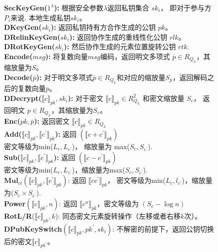 \begin{figure}[!htb]
	\begin{framed}
		\noindent \textbf{SecKeyGen($1^\lambda$):} 根据安全参数$ \lambda $返回私钥集合 ${sk_i}$，
		即对于参与方$P_i$来说. 本地生成私钥$ sk_i $。\\
		\noindent \textbf{DKeyGen(${sk_i}$):} 返回私钥持有方合作生成的公钥 $pk$。\\
		\noindent \textbf{DRelinKeyGen(${sk_i}$):} 返回协作生成的重线性化公钥 $rlk$。\\
		\noindent \textbf{DRotKeyGen(${sk_i}$):} 然后协作生成的元素位置旋转公钥 $rtk$.\\
		\noindent \textbf{Encode($msg$):} 将复数向量$msg$编码，返回明文多项式 $\overline{p}\in R_{Q_{L}}$，其缩放量为$S$。\\
		\noindent \textbf{Decode($\overline{p}$):} 对于明文多项式$\overline{p}\in R_{Q_{L}}$和对应的缩放量$S_{\overline{p}}$，返回解码之后的复数向量$\overline{p}$。\\
		\noindent \textbf{DDecrypt($\llbracket c\rrbracket_{pk}, {sk_i}$):} 对于密文 $\llbracket c\rrbracket_{pk}\in R^2_{Q_{L}}$ 和密文缩放量 $S_c$， 返回明文 $p\in R_{Q_{L}}$，其缩放量为$S_c$。\\
		\noindent \textbf{Enc($pk, \overline{p}$):} 返回密文 $\llbracket c\rrbracket_{pk}\in R_{Q_{L}}$ \\
		\noindent \textbf{Add($\llbracket c\rrbracket_{pk}, \llbracket c^{\prime}\rrbracket_{pk}$):} 返回 $(\llbracket c+c^{\prime}\rrbracket_{pk})$ \\
		密文等级为min($L_c, L_{c^{\prime}}$)， 缩放量为 max($S_c, S_{c^{\prime}}$).\\
		\noindent \textbf{Sub($\llbracket c\rrbracket_{pk}, \llbracket c^{\prime}\rrbracket_{pk}$):} 返回 $(\llbracket c-c^{\prime}\rrbracket_{pk})$ \\
		密文等级为min($L_c, L_{c^{\prime}}$)，缩放量为max($S_c, S_{c^{\prime}}$).\\
		\noindent $\textbf{Mul}_{ct}$$(\llbracket c\rrbracket_{pk}, \llbracket c^{\prime}\rrbracket_{pk})$: 返回 $\llbracket cc^{\prime}\rrbracket_{pk}$， 密文等级为min($L_c, l_{c^{\prime}}$)，缩放量为($S_c\times S_{c^{\prime}}$).\\
		\noindent \textbf{Power}$(\llbracket c\rrbracket_{pk}, n)$: 返回 $\llbracket c^{n}\rrbracket_{pk}$，密文等级为 $(S_c-\log{n})$\\
		\noindent \textbf{RotL/R}($\llbracket c\rrbracket_{pk}, k$): 同态密文元素旋转操作（左移或者右移$k$次）。\\
		\noindent \textbf{DPubKeySwitch}$(\llbracket c\rrbracket_{pk}, pk^{\prime},{sk_i})$: 不解密的前提下，返回公钥切换后的密文$\llbracket c\rrbracket_{pk^{\prime}}$。\\
$$
\end{framed}
\end{figure}
